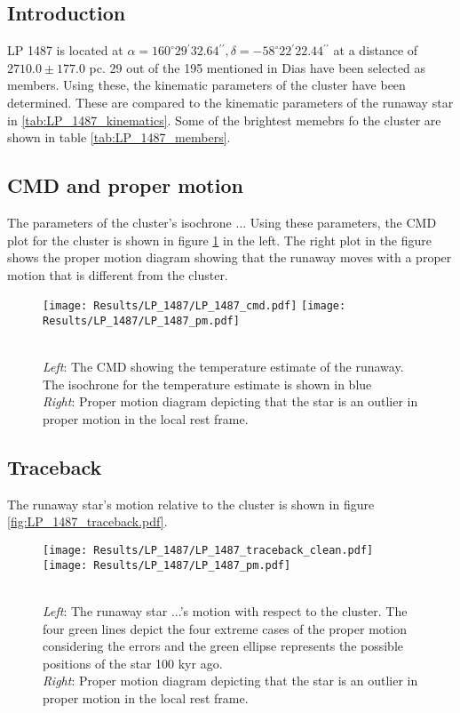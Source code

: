 \subsection{Introduction}
    LP 1487 is located at $\alpha = 160^\circ29{}^\prime32.64{}^{\prime\prime}, \delta = -58^\circ22{}^\prime22.44{}^{\prime\prime}$ at a distance of $2710.0\pm177.0$ pc.
    29 out of the 195 mentioned in Dias have been selected as members. Using these, the kinematic parameters of the cluster have been determined. These are compared to the kinematic parameters of the runaway star in \ref{tab:LP_1487_kinematics}. Some of the brightest memebrs fo the cluster are shown in table \ref{tab:LP_1487_members}.
    
    \subsection{CMD and proper motion}
    The parameters of the cluster's isochrone ...
    Using these parameters, the CMD plot for the cluster is shown in figure \ref{fig:LP_1487_cmd_pm} in the left. The right plot in the figure shows the proper motion diagram showing that the runaway moves with a proper motion that is different from the cluster.
    
    \begin{figure}
    \centering
    \texttt{[image: Results/LP\_1487/LP\_1487\_cmd.pdf]}
    \texttt{[image: Results/LP\_1487/LP\_1487\_pm.pdf]}
    \caption{\\ 
    \textit{Left}: The CMD showing the temperature estimate of the runaway. The isochrone for the temperature estimate is shown in blue \\
    \textit{Right}: Proper motion diagram depicting that the star is an outlier in proper motion in the local rest frame.}
        \label{fig:LP_1487_cmd_pm}
    \end{figure}    

    \subsection{Traceback}
    
    The runaway star's motion relative to the cluster is shown in figure \ref{fig:LP_1487_traceback.pdf}.
    
    \begin{figure}
    \centering
    \texttt{[image: Results/LP\_1487/LP\_1487\_traceback\_clean.pdf]}
    \texttt{[image: Results/LP\_1487/LP\_1487\_pm.pdf]}
    \caption{\\ 
    \textit{Left}: The runaway star ...'s motion with respect to the cluster. The four green lines depict the four extreme cases of the proper motion considering the errors and the green ellipse represents the possible positions of the star 100 kyr ago. \\
    \textit{Right}: Proper motion diagram depicting that the star is an outlier in proper motion in the local rest frame.}
        \label{fig:LP_1487_traceback_clean&pm}
    \end{figure}
    
